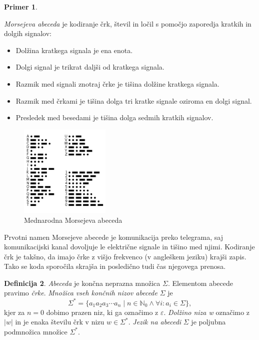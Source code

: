 \documentclass{amsart}
\newcommand{\N}{\mathbb{N}}
\theoremstyle{definition}
\newtheorem{definicija}{Definicija}[section]
\newtheorem{primer}[definicija]{Primer}
\theoremstyle{plain} %
\begin{document}
\begin{primer}\label{Morse}

    \textit{Morsejeva abeceda} je kodiranje črk, števil in ločil s pomočjo zaporedja kratkih
    in dolgih signalov:

    \begin{itemize}
        \item Dolžina kratkega signala je ena enota.
        \item Dolgi signal je trikrat daljši od kratkega signala.
        \item Razmik med signali znotraj črke je tišina dolžine kratkega signala.
        \item Razmik med črkami je tišina dolga tri kratke signale oziroma en dolgi signal.
        \item Presledek med besedami je tišina dolga sedmih kratkih signalov.
    \end{itemize}

    \begin{figure}[h]
        \centering
        \includegraphics[width=4.3cm]{International_Morse_Code.svg.png}
        \caption{Mednarodna Morsejeva abeceda}
        \label{fig:Morse}
    \end{figure}

    Prvotni namen Morsejeve abecede je komunikacija preko telegrama, saj komunikacijski
    kanal dovoljuje le električne signale in tišino med njimi. Kodiranje črk je takšno,
    da imajo črke z višjo frekvenco (v angleškem jeziku) krajši zapis. Tako se koda
    sporočila skrajša in posledično tudi čas njegovega prenosa.

\end{primer}

\begin{definicija}

    \textit{Abeceda} je končna neprazna množica $ \Sigma $. Elementom abecede pravimo \textit{črke}.
    \textit{Množica vseh končnih nizov abecede} $ \Sigma $ je
    \[
        \Sigma^* = \{ a_1 a_2 a_3 \cdots a_n \mid n \in \N_0 \land \forall i: a_i \in \Sigma \}, 
    \]
    kjer za $ n = 0 $ dobimo prazen niz, ki ga označimo z $ \varepsilon $.
    \textit{Dolžino niza w} označimo z $ |w| $ in je enaka številu črk v nizu $ w \in \Sigma^* $.
    \textit{Jezik na abecedi} $ \Sigma $ je poljubna podmnožica množice $ \Sigma^* $. 

\end{definicija}
\end{document}
